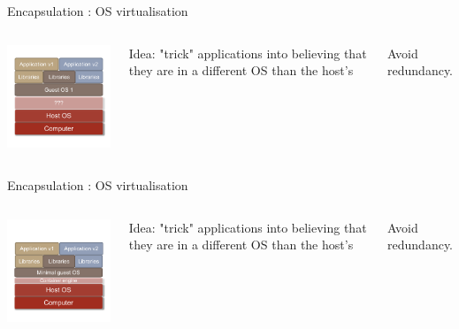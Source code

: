 \begin{frame}{Encapsulation : OS virtualisation}
\begin{columns}

\includegraphics[width=6cm]{02_encapsulation/figures/intro_os_virtualisation_59.pdf}

Idea: "trick" applications into believing that they are in a different OS than the host's

Avoid redundancy.

\end{columns}
\end{frame}

\begin{frame}{Encapsulation : OS virtualisation}
\begin{columns}

\includegraphics[width=6cm]{02_encapsulation/figures/intro_docker_60.pdf}

Idea: "trick" applications into believing that they are in a different OS than the host's

Avoid redundancy.

\logoDockerPortrait

\end{columns}
\end{frame}


